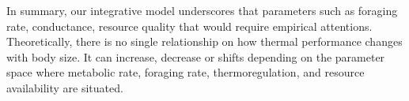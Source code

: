 In summary, our integrative model underscores that parameters such as foraging rate, conductance, resource quality that would require empirical attentions.
Theoretically, there is no single relationship on how thermal performance changes with body size.
It can increase, decrease or shifts depending on the parameter space where metabolic rate, foraging rate, thermoregulation, and resource availability are situated.




%
%
%
 
